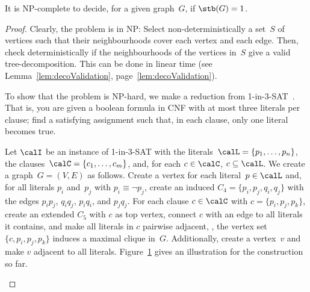 \begin{theorem}
    \label{theo:stbNPc}
It is NP-complete to decide, for a given graph~\( G \), if \( \stb(G) = 1 \).
\end{theorem}

\begin{proof}
Clearly, the problem is in NP:
Select non-deterministically a set~$S$ of vertices such that their neighbourhoods cover each vertex and each edge.
Then, check deterministically if the neighbourhoods of the vertices in~$S$ give a valid tree-decomposition.
This can be done in linear time (see Lemma~\ref{lem:decoValidation}, page~\ref{lem:decoValidation}).

To show that the problem is NP-hard, we make a reduction from 1-in-3-SAT~\cite{Schaefer1978}.
That is, you are given a boolean formula in CNF with at most three literals per clause; find a satisfying assignment such that, in each clause, only one literal becomes true.

Let $\calI$ be an instance of 1-in-3-SAT with the literals~$\calL = \{ p_1, \ldots, p_n \}$, the clauses~$\calC = \{ c_1, \ldots, c_m \}$, and, for each $c \in \calC$, $c \subseteq \calL$.
We create a graph~$G = (V, E)$ as follows.
Create a vertex for each literal~$p \in \calL$ and, for all literals $p_i$ and~$p_j$ with $p_i \equiv \neg p_j$, create an induced $C_4 = \{ p_i, p_j, q_i, q_j \}$ with the edges $p_ip_j$, $q_iq_j$, $p_iq_i$, and $p_jq_j$.
For each clause $c \in \calC$ with $c = \{ p_i, p_j, p_k \}$, create an extended $C_5$ with $c$ as top vertex, connect $c$ with an edge to all literals it contains, and make all literals in $c$ pairwise adjacent, \ie, the vertex set $\{ c, p_i, p_j, p_k \}$ induces a maximal clique in~$G$.
Additionally, create a vertex~$v$ and make $v$ adjacent to all literals.
Figure~\ref{fig:stbNPc} gives an illustration for the construction so far.

\begin{figure}
    [htb]
    \centering

    \begin{subfigure}[b]{0.45\textwidth}
        \centering
        
        \caption{}
        \label{fig:stbNPc}
    \end{subfigure}
    \hfil
    \begin{subfigure}[b]{0.45\textwidth}
        \centering
        
        \caption{}
        \label{fig:stbNPcRS}
    \end{subfigure}


\end{figure}
\end{proof}
